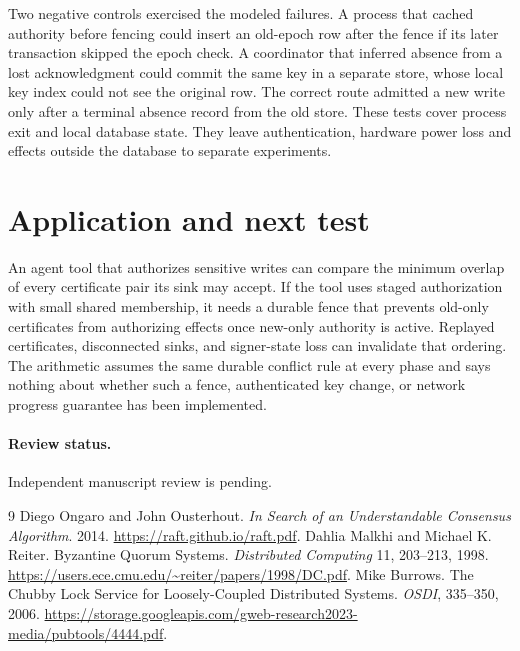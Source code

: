 \documentclass[11pt]{article}
\begin{document}
Two negative controls exercised the modeled failures. A process
that cached authority before fencing could insert an old-epoch row
after the fence if its later transaction skipped the epoch check.
A coordinator that inferred absence from a lost acknowledgment
could commit the same key in a separate store, whose local key
index could not see the original row. The correct route admitted
a new write only after a terminal absence record from the old
store. These tests cover process exit and local database state.
They leave authentication, hardware power loss and effects outside
the database to separate experiments.

\section{Application and next test}
An agent tool that authorizes sensitive writes can compare the
minimum overlap of every certificate pair its sink may accept.
If the tool uses staged authorization with small shared membership,
it needs a durable fence that prevents old-only certificates
from authorizing effects once new-only authority is active.
Replayed certificates, disconnected sinks, and signer-state
loss can invalidate that ordering. The arithmetic assumes the
same durable conflict rule at every phase and says nothing
about whether such a fence, authenticated key change, or
network progress guarantee has been implemented.

\paragraph{Review status.} Independent manuscript review is pending.

\begin{thebibliography}{9}
 Diego Ongaro and John Ousterhout. \emph{In Search of an Understandable Consensus Algorithm}. 2014. \url{https://raft.github.io/raft.pdf}.
 Dahlia Malkhi and Michael K. Reiter.
Byzantine Quorum Systems. \emph{Distributed Computing}
11, 203--213, 1998.
\url{https://users.ece.cmu.edu/~reiter/papers/1998/DC.pdf}.
 Mike Burrows. The Chubby Lock Service for
Loosely-Coupled Distributed Systems. \emph{OSDI},
335--350, 2006.
\url{https://storage.googleapis.com/gweb-research2023-media/pubtools/4444.pdf}.
\end{thebibliography}
\end{document}
